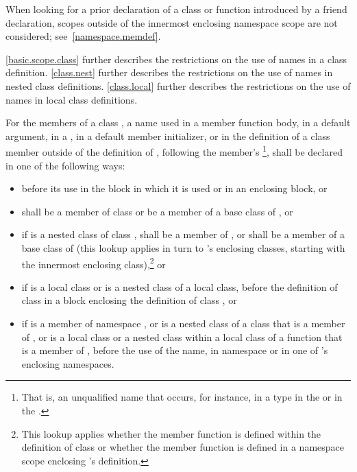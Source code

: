 \begin{note}
When looking for a prior declaration of a class
or function introduced by a friend declaration, scopes outside
of the innermost enclosing namespace scope are not considered;
see~\ref{namespace.memdef}. \end{note} \begin{note} \ref{basic.scope.class}
further describes the restrictions on the use of names in a class
definition. \ref{class.nest} further describes the restrictions on the
use of names in nested class definitions. \ref{class.local} further
describes the restrictions on the use of names in local class
definitions.
\end{note}

\pnum
For the members of a class , a name used in a member function
body, in a default argument, in a , in a
default member initializer, or in the definition of a class member
outside of the definition of , following the
member's
\footnote{That is, an unqualified name that occurs,
for instance, in a
type in the
 or in the
.}, shall be declared in one of the
following ways:
\begin{itemize}
\item before its use in the block in which it is used or in an enclosing
block, or

\item shall be a member of class  or be a member of a base
class of , or

\item if 
is a nested class of class , shall be a
member of , or shall be a member of a base class of 
(this lookup applies in turn to 's enclosing classes, starting
with the innermost enclosing class),\footnote{This lookup applies whether
the member function is defined
within the definition of class  or whether the member function
is defined in a namespace scope enclosing 's definition.}
or

\item if  is a local class or is a nested
class of a local class, before the definition of class  in a
block enclosing the definition of class , or

\item if  is a member of namespace , or is a nested
class of a class that is a member of , or is a local class or a
nested class within a local class of a function that is a member of
, before the use of the name, in namespace 
or in one of 's enclosing namespaces.
\end{itemize}
